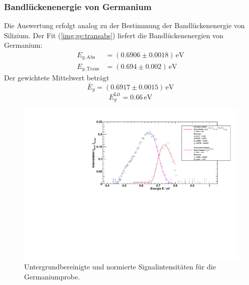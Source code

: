 \subsubsection{Bandlückenenergie von Germanium}
Die Auswertung erfolgt analog zu der Bestimmung der Bandlückenenergie von Silizium. Der Fit (\autoref{img:ge:transabs})
liefert die Bandlückenenergien von Germanium:
\begin{equation}
\begin{split}
  E_{g, \text{Abs}} &= (0.6906 \pm 0.0018)\,\text{eV} \\
  E_{g, \text{Trans}} &= (0.694 \pm 0.002)\,\text{eV}
\end{split}
\end{equation}
Der gewichtete Mittelwert beträgt
\begin{equation}
  \bar{E}_g = (0.6917 \pm 0.0015)\,\text{eV}
\end{equation}
\begin{equation}
  E_g^{\text{Lit}} = 0.66\,\text{eV}
\end{equation}

\begin{figure}[H]
\begin{center}
  \includegraphics[width=\textwidth]{../img/part1/Ge_fit_AbsTrans.pdf}
  \caption{Untergrundbereinigte und normierte Signalintensitäten für die Germaniumprobe.}
  \label{img:ge:transabs}
\end{center}
\end{figure}
